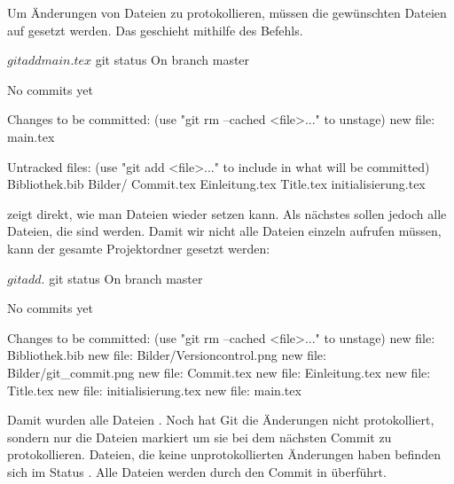 Um Änderungen von Dateien zu protokollieren, müssen die gewünschten Dateien auf  gesetzt werden. Das geschieht mithilfe des    Befehls.
\begin{mplisting}
$ git add main.tex
$ git status
On branch master

No commits yet

Changes to be committed:
  (use "git rm --cached <file>..." to unstage)
	new file:   main.tex

Untracked files:
  (use "git add <file>..." to include in what will be committed)
	Bibliothek.bib
	Bilder/
	Commit.tex
	Einleitung.tex
	Title.tex
	initialisierung.tex
\end{mplisting}
 zeigt direkt, wie man Dateien wieder  setzen kann. Als nächstes sollen jedoch alle Dateien, die  sind  werden. Damit wir nicht alle Dateien einzeln aufrufen müssen, kann der gesamte Projektordner  gesetzt werden:
\begin{mplisting}
$ git add .
$ git status
On branch master

No commits yet

Changes to be committed:
  (use "git rm --cached <file>..." to unstage)
	new file:   Bibliothek.bib
	new file:   Bilder/Versioncontrol.png
	new file:   Bilder/git_commit.png
	new file:   Commit.tex
	new file:   Einleitung.tex
	new file:   Title.tex
	new file:   initialisierung.tex
	new file:   main.tex

\end{mplisting}
Damit wurden alle Dateien . Noch hat Git die Änderungen nicht protokolliert, sondern nur die Dateien markiert um sie bei dem nächsten Commit zu protokollieren. Dateien, die keine unprotokollierten Änderungen haben befinden sich im Status . Alle  Dateien werden durch den Commit in  überführt.
